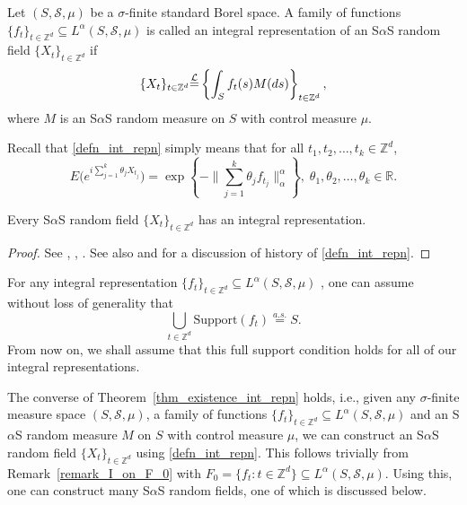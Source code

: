 \documentclass[12pt]{amsart}
\begin{document}
\begin{defn}  Let $(S, \mathcal{S}, \mu)$ be a $\sigma$-finite standard Borel space. A family of functions $\{f_t\}_{t \in \mathbb{Z}^d} \subseteq L^\alpha(S, \mathcal{S}, \mu)$ is called an integral representation of an S$\alpha$S random field ${\{X_t\}_{t \in \mathbb{Z}^d}}$ if
\begin{equation}
{\{X_t\}_{t \in \mathbb{Z}^d}} {\stackrel{\footnotesize{\mathcal{L}}}{=}} \left\{\int_S f_t(s)M(ds)\right\}_{t \in {\mathbb{Z}^d}}, \label{defn_int_repn}
\end{equation}
where $M$ is an S$\alpha$S random measure on $S$ with control measure $\mu$.
\end{defn}

Recall that \eqref{defn_int_repn} simply means that for all $t_1, t_2, \ldots, t_k \in {\mathbb{Z}^d}$,
\begin{equation}
E\big(e^{i\sum_{j=1}^k \theta_j X_{t_j}}\big) = \exp{\left\{-\Big\|\sum_{j=1}^k \theta_j f_{t_j}\Big\|_\alpha^\alpha\right\}}, \; \theta_1, \theta_2, \ldots, \theta_k \in {\mathbb{R}}. \label{meaning_of_int_repn}
\end{equation}

\normalsize

\begin{thm} \label{thm_existence_int_repn} Every S$\alpha$S random field ${\{X_t\}_{t \in \mathbb{Z}^d}}$ has an integral representation.
\end{thm}

\begin{proof} See \cite{bretagnolle:dacunha-castelle:krivine:1966}, \cite{schreiber:1972}, \cite{schilder:1970}. See also \cite{kuelbs:1973} and \cite{hardin:1982b} for a discussion of history of \eqref{defn_int_repn}.
\end{proof}

For any integral representation $\{f_t\}_{t \in \mathbb{Z}^d} \subseteq L^\alpha(S, \mathcal{S}, \mu)$ , one can assume without loss of generality that
\[
\bigcup_{t \in {\mathbb{Z}^d}} \mbox{Support}(f_t) {\stackrel{a.s.}{=}} S.
\]
From now on, we shall assume that this full support condition holds for all of our integral representations.

The converse of Theorem~\ref{thm_existence_int_repn} holds, i.e., given any $\sigma$-finite measure space $(S, \mathcal{S}, \mu)$, a family of functions $\{f_t\}_{t \in \mathbb{Z}^d} \subseteq L^\alpha(S, \mathcal{S}, \mu)$ and an S$\alpha$S random measure $M$ on $S$ with control measure $\mu$, we can construct an S$\alpha$S random field ${\{X_t\}_{t \in \mathbb{Z}^d}}$ using \eqref{defn_int_repn}. This follows trivially from Remark~\ref{remark_I_on_F_0} with $F_0=\{f_t: t \in \mathbb{Z}^d\}\subseteq L^\alpha(S, \mathcal{S}, \mu)$. Using this, one can construct many S$\alpha$S random fields, one of which is discussed below.
\end{document}

